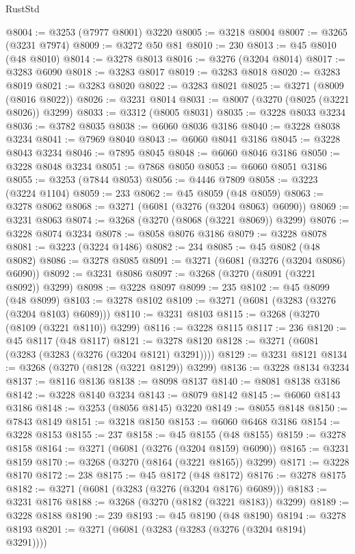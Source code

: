 \begin{lexlean}{RustStd}
\begin{coremodule}
@8004 := @3253 (@7977 @8001) @3220
@8005 := @3218 @8004
@8007 := @3265 (@3231 @7974)
@8009 := @3272 @50 @81
@8010 := 230
@8013 := @45 @8010 (@48 @8010)
@8014 := @3278 @8013
@8016 := @3276 (@3204 @8014)
@8017 := @3283 @6090
@8018 := @3283 @8017
@8019 := @3283 @8018
@8020 := @3283 @8019
@8021 := @3283 @8020
@8022 := @3283 @8021
@8025 := @3271 (@8009 (@8016 @8022))
@8026 := @3231 @8014
@8031 := @8007 (@3270 (@8025 (@3221 @8026)) @3299)
@8033 := @3312 (@8005 @8031)
@8035 := @3228 @8033 @3234
@8036 := @3782 @8035
@8038 := @6060 @8036 @3186
@8040 := @3228 @8038 @3234
@8041 := @7969 @8040
@8043 := @6060 @8041 @3186
@8045 := @3228 @8043 @3234
@8046 := @7895 @8045
@8048 := @6060 @8046 @3186
@8050 := @3228 @8048 @3234
@8051 := @7868 @8050
@8053 := @6060 @8051 @3186
@8055 := @3253 (@7844 @8053)
@8056 := @4446 @7809
@8058 := @3223 (@3224 @1104)
@8059 := 233
@8062 := @45 @8059 (@48 @8059)
@8063 := @3278 @8062
@8068 := @3271 (@6081 (@3276 (@3204 @8063) @6090))
@8069 := @3231 @8063
@8074 := @3268 (@3270 (@8068 (@3221 @8069)) @3299)
@8076 := @3228 @8074 @3234
@8078 := @8058 @8076 @3186
@8079 := @3228 @8078
@8081 := @3223 (@3224 @1486)
@8082 := 234
@8085 := @45 @8082 (@48 @8082)
@8086 := @3278 @8085
@8091 := @3271 (@6081 (@3276 (@3204 @8086) @6090))
@8092 := @3231 @8086
@8097 := @3268 (@3270 (@8091 (@3221 @8092)) @3299)
@8098 := @3228 @8097
@8099 := 235
@8102 := @45 @8099 (@48 @8099)
@8103 := @3278 @8102
@8109 := @3271 (@6081 (@3283 (@3276 (@3204 @8103) @6089)))
@8110 := @3231 @8103
@8115 := @3268 (@3270 (@8109 (@3221 @8110)) @3299)
@8116 := @3228 @8115
@8117 := 236
@8120 := @45 @8117 (@48 @8117)
@8121 := @3278 @8120
@8128 := @3271 (@6081 (@3283 (@3283 (@3276 (@3204 @8121) @3291))))
@8129 := @3231 @8121
@8134 := @3268 (@3270 (@8128 (@3221 @8129)) @3299)
@8136 := @3228 @8134 @3234
@8137 := @8116 @8136
@8138 := @8098 @8137
@8140 := @8081 @8138 @3186
@8142 := @3228 @8140 @3234
@8143 := @8079 @8142
@8145 := @6060 @8143 @3186
@8148 := @3253 (@8056 @8145) @3220
@8149 := @8055 @8148
@8150 := @7843 @8149
@8151 := @3218 @8150
@8153 := @6060 @6468 @3186
@8154 := @3228 @8153
@8155 := 237
@8158 := @45 @8155 (@48 @8155)
@8159 := @3278 @8158
@8164 := @3271 (@6081 (@3276 (@3204 @8159) @6090))
@8165 := @3231 @8159
@8170 := @3268 (@3270 (@8164 (@3221 @8165)) @3299)
@8171 := @3228 @8170
@8172 := 238
@8175 := @45 @8172 (@48 @8172)
@8176 := @3278 @8175
@8182 := @3271 (@6081 (@3283 (@3276 (@3204 @8176) @6089)))
@8183 := @3231 @8176
@8188 := @3268 (@3270 (@8182 (@3221 @8183)) @3299)
@8189 := @3228 @8188
@8190 := 239
@8193 := @45 @8190 (@48 @8190)
@8194 := @3278 @8193
@8201 := @3271 (@6081 (@3283 (@3283 (@3276 (@3204 @8194) @3291))))

\end{coremodule}
\end{lexlean}
